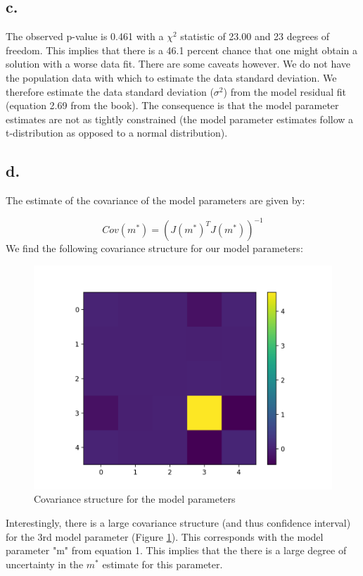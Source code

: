 \documentclass{article}
\begin{document}
\subsection{c.}
The observed p-value is 0.461 with a $\chi^2$ statistic of 23.00 and 23 degrees of freedom. This implies that there is a 46.1 percent chance that one might obtain a solution with a worse data fit. There are some caveats however. We do not have the population data with which to estimate the data standard deviation. We therefore estimate the data standard deviation ($\sigma^2$) from the model residual fit (equation 2.69 from the book). The consequence is that the model parameter estimates are not as tightly constrained (the model parameter estimates follow a t-distribution as opposed to a normal distribution).  

\subsection{d.}
The estimate of the covariance of the model parameters are given by:

\begin{equation}
Cov(m^*) = (J(m^*)^TJ(m^*))^{-1}
\end{equation}
We find the following covariance structure for our model parameters: 
\begin{figure}[ht!]
    \centering
    \includegraphics[width=\textwidth]{2d_covar_matrix.png}
    \caption{Covariance structure for the model parameters}
    \label{covarmat}
\end{figure}
Interestingly, there is a large covariance structure (and thus confidence interval) for the 3rd model parameter (Figure \ref{covarmat}). This corresponds with the model parameter "m" from equation 1. This implies that the there is a large degree of uncertainty in the $m^*$ estimate for this parameter. 
\end{document}
